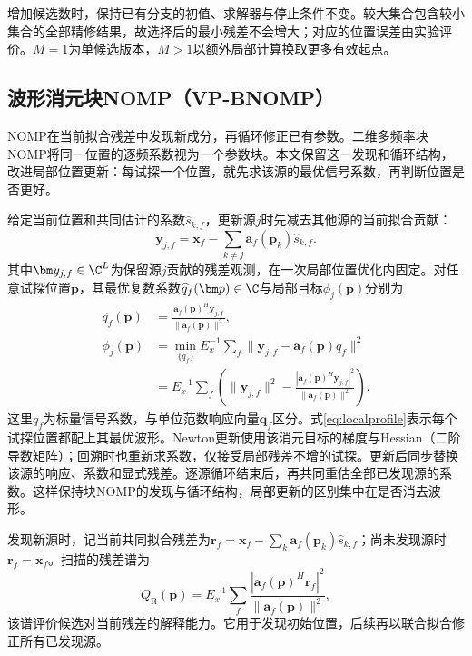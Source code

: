 增加候选数时，保持已有分支的初值、求解器与停止条件不变。较大集合包含较小集合的全部精修结果，故选择后的最小残差不会增大；对应的位置误差由实验评价。$M=1$为单候选版本，$M>1$以额外局部计算换取更多有效起点。

\subsection{波形消元块NOMP（VP-BNOMP）}\label{sec:vpnomp}
NOMP在当前拟合残差中发现新成分，再循环修正已有参数\cite{Mamandipoor2016}。二维多频率块NOMP将同一位置的逐频系数视为一个参数块\cite{Yang2022}。本文保留这一发现和循环结构，改进局部位置更新：每试探一个位置，就先求该源的最优信号系数，再判断位置是否更好。

给定当前位置和共同估计的系数$\widehat s_{k,f}$，更新源$j$时先减去其他源的当前拟合贡献：
\begin{equation}
 \bm y_{j,f}=\bm x_f-\sum_{k\ne j}\bm a_f(\bm p_k)\widehat s_{k,f} .
 \label{eq:targetResidual}
\end{equation}
其中$\bm y_{j,f}\in\C^L$为保留源$j$贡献的残差观测，在一次局部位置优化内固定。对任意试探位置$\bm p$，其最优复数系数$\widehat q_f(\bm p)\in\C$与局部目标$\phi_j(\bm p)$分别为
\begin{align}
 \widehat q_f(\bm p)&=\frac{\bm a_f(\bm p)^H\bm y_{j,f}}
 {\|\bm a_f(\bm p)\|^2},\label{eq:localcoef}\\
 \phi_j(\bm p)&=\min_{\{q_f\}}E_x^{-1}\sum_f
 \|\bm y_{j,f}-\bm a_f(\bm p)q_f\|^2\nonumber\\
 &=E_x^{-1}\sum_f\left(\|\bm y_{j,f}\|^2-
 \frac{|\bm a_f(\bm p)^H\bm y_{j,f}|^2}{\|\bm a_f(\bm p)\|^2}\right).
 \label{eq:localprofile}
\end{align}
这里$q_f$为标量信号系数，与单位范数响应向量$\bm q_f$区分。式\eqref{eq:localprofile}表示每个试探位置都配上其最优波形。Newton更新使用该消元目标的梯度与Hessian（二阶导数矩阵）；回溯时也重新求系数，仅接受局部残差不增的试探。更新后同步替换该源的响应、系数和显式残差。逐源循环结束后，再共同重估全部已发现源的系数。这样保持块NOMP的发现与循环结构，局部更新的区别集中在是否消去波形。

发现新源时，记当前共同拟合残差为$\bm r_f=\bm x_f-\sum_k\bm a_f(\bm p_k)\widehat s_{k,f}$；尚未发现源时$\bm r_f=\bm x_f$。扫描的残差谱为
\begin{equation}
 Q_{\mathrm R}(\bm p)=E_x^{-1}\sum_f
 \frac{|\bm a_f(\bm p)^H\bm r_f|^2}{\|\bm a_f(\bm p)\|^2},
 \label{eq:residualScore}
\end{equation}
该谱评价候选对当前残差的解释能力。它用于发现初始位置，后续再以联合拟合修正所有已发现源。


